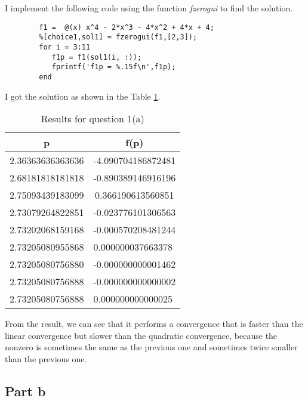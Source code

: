 \begin{answer}
    I implement the following code using the function \textit{fzerogui} to find the solution.
    \begin{verbatim}
        f1 =  @(x) x^4 - 2*x^3 - 4*x^2 + 4*x + 4;
        %[choice1,sol1] = fzerogui(f1,[2,3]);
        for i = 3:11
           f1p = f1(sol1(i, :));
           fprintf('f1p = %.15f\n',f1p);
        end
    \end{verbatim}
    I got the solution as shown in the Table \ref{tab:tab1}.
    \begin{table}[H]
        \centering
        \caption{Results for question 1(a)}
        \label{tab:tab1}
        \begin{tabular}{c|c}
            \textbf{p}                            & \textbf{f(p)}                          \\ \hline
            2.36363636363636                      & -4.090704186872481                     \\ \hline
            2.68181818181818                      & -0.890389146916196                     \\ \hline
            2.75093439183099                      & 0.366190613560851                      \\ \hline
            2.73079264822851                      & -0.023776101306563                     \\ \hline
            2.73202068159168                      & -0.000570208481244                     \\ \hline
            \multicolumn{1}{l|}{2.73205080955868} & \multicolumn{1}{l}{0.000000037663378}  \\ \hline
            2.73205080756880                      & -0.000000000001462                     \\ \hline
            \multicolumn{1}{l|}{2.73205080756888} & \multicolumn{1}{l}{-0.000000000000002} \\ \hline
            \multicolumn{1}{l|}{2.73205080756888} & \multicolumn{1}{l}{0.000000000000025} 
        \end{tabular}
    \end{table}
    From the result, we can see that it performs a convergence that is faster than the linear convergence but slower than the quadratic convergence, because the nonzero is sometimes the same as the previous one and sometimes twice smaller than the previous one.
\end{answer}

\subsection{Part b}

